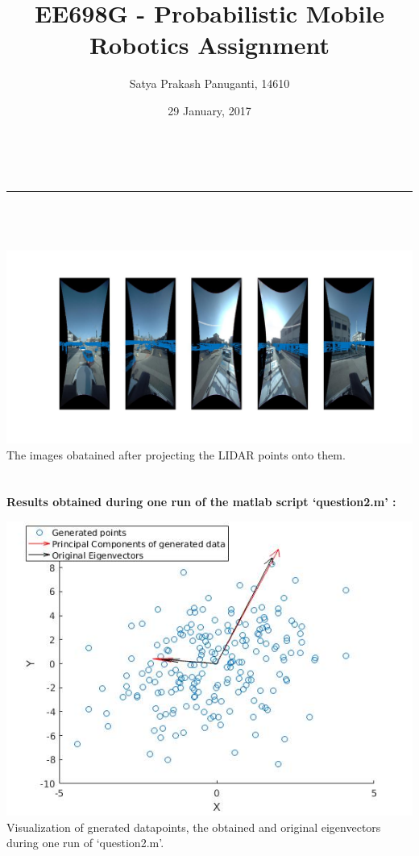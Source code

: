 \documentclass[a4paper,fleqn,11pt]{article}
\makeatletter
\newcommand{\linia}{\rule{\linewidth}{0.5pt}}
\theoremstyle{mytheor}
\renewcommand{\maketitle}{
\begin{center}
\vspace{2ex}
{\huge \textsc{\@title}}
\vspace{1ex}
\\
\linia\\
\@author \hfill \@date
\vspace{4ex}
\end{center}
}
\makeatother
\begin{document}
\title{EE698G - Probabilistic Mobile Robotics Assignment}

\author{Satya Prakash Panuganti, 14610}

\date{29 January, 2017}

\maketitle

\section{}

\begin{center}
\includegraphics[scale = 0.37]{../images/q1output.jpg}
The images obatained after projecting the LIDAR points onto them.
\end{center}

\pagebreak

\section{}

\textbf{Results obtained during one run of the matlab script `question2.m' :}

\begin{center}
\includegraphics[scale = 0.8]{../images/q2output.jpg} \\
Visualization of gnerated datapoints, the obtained and original eigenvectors during one run of `question2.m'.
\end{center}
\end{document}

